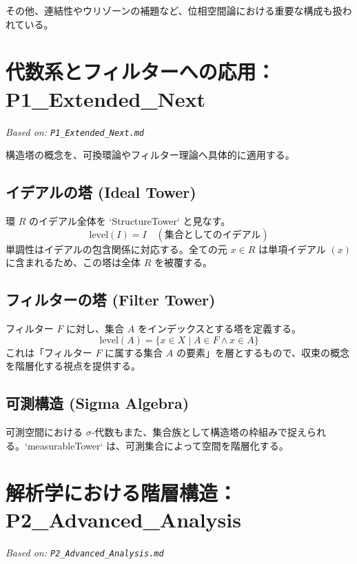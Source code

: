 \documentclass[a4paper,11pt]{ltjsarticle}
\theoremstyle{definition}
\begin{document}
その他、連結性やウリゾーンの補題など、位相空間論における重要な構成も扱われている。

\section{代数系とフィルターへの応用：P1\_Extended\_Next}
\label{sec:p1_extended_next}
\textit{Based on: \texttt{P1\_Extended\_Next.md}}

構造塔の概念を、可換環論やフィルター理論へ具体的に適用する。

\subsection{イデアルの塔 (Ideal Tower)}
環 $R$ のイデアル全体を `StructureTower` と見なす。
\[ \mathrm{level}(I) = I \quad (\text{集合としてのイデアル}) \]
単調性はイデアルの包含関係に対応する。全ての元 $x \in R$ は単項イデアル $(x)$ に含まれるため、この塔は全体 $R$ を被覆する。

\subsection{フィルターの塔 (Filter Tower)}
フィルター $F$ に対し、集合 $A$ をインデックスとする塔を定義する。
\[ \mathrm{level}(A) = \{x \in X \mid A \in F \land x \in A\} \]
これは「フィルター $F$ に属する集合 $A$ の要素」を層とするもので、収束の概念を階層化する視点を提供する。

\subsection{可測構造 (Sigma Algebra)}
可測空間における $\sigma$-代数もまた、集合族として構造塔の枠組みで捉えられる。`measurableTower` は、可測集合によって空間を階層化する。

\section{解析学における階層構造：P2\_Advanced\_Analysis}
\label{sec:p2}
\textit{Based on: \texttt{P2\_Advanced\_Analysis.md}}
\end{document}
